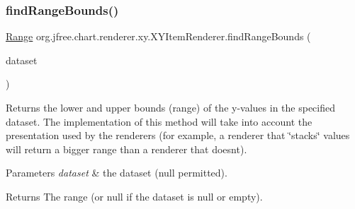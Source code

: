 \mbox{\label{interfaceorg_1_1jfree_1_1chart_1_1renderer_1_1xy_1_1_x_y_item_renderer_af9ac6f440e99c73d343de7851e89496a}} 
\subsubsection{\texorpdfstring{find\+Range\+Bounds()}{findRangeBounds()}}
{\footnotesize\ttfamily \mbox{\hyperlink{classorg_1_1jfree_1_1data_1_1_range}{Range}} org.\+jfree.\+chart.\+renderer.\+xy.\+X\+Y\+Item\+Renderer.\+find\+Range\+Bounds (\begin{DoxyParamCaption}\item[{\mbox{\hyperlink{interfaceorg_1_1jfree_1_1data_1_1xy_1_1_x_y_dataset}{X\+Y\+Dataset}}}]{dataset }\end{DoxyParamCaption})}

Returns the lower and upper bounds (range) of the y-\/values in the specified dataset. The implementation of this method will take into account the presentation used by the renderers (for example, a renderer that \char`\"{}stacks\char`\"{} values will return a bigger range than a renderer that doesn\textquotesingle{}t).


\begin{DoxyParams}{Parameters}
{\em dataset} & the dataset ({\ttfamily null} permitted).\\
\hline
\end{DoxyParams}
\begin{DoxyReturn}{Returns}
The range (or {\ttfamily null} if the dataset is {\ttfamily null} or empty). 
\end{DoxyReturn}


